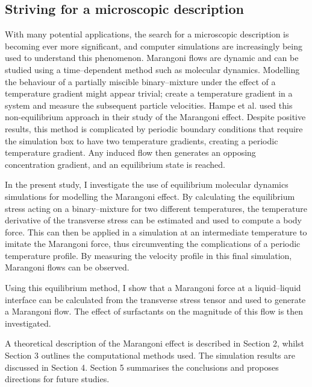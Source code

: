 \subsection{Striving for a microscopic description}
With many potential applications, the search for a microscopic description is becoming ever more significant, and computer simulations are increasingly being used to understand this phenomenon.
Marangoni flows are dynamic and can be studied using a time--dependent method such as molecular dynamics.
Modelling the behaviour of a partially miscible binary--mixture under the effect of a temperature gradient might appear trivial; create a temperature gradient in a system and measure the subsequent particle velocities.
Hampe et al. used this non-equilibrium approach in their study of the Marangoni effect.\cite{HolgerBoppHampe}
Despite positive results, this method is complicated by periodic boundary conditions that require the simulation box to have two temperature gradients, creating a periodic temperature gradient.
Any induced flow then generates an opposing concentration gradient, and an equilibrium state is reached.

In the present study, I investigate the use of equilibrium molecular dynamics simulations for modelling the Marangoni effect.
By calculating the equilibrium stress acting on a binary--mixture for two different temperatures, the temperature derivative of the transverse stress can be estimated and used to compute a body force.
This can then be applied in a simulation at an intermediate temperature to imitate the Marangoni force, thus circumventing the complications of a periodic temperature profile.
By measuring the velocity profile in this final simulation, Marangoni flows can be observed.

Using this equilibrium method, I show that a Marangoni force at a liquid--liquid interface can be calculated from the transverse stress tensor and used to generate a Marangoni flow.
The effect of surfactants on the magnitude of this flow is then investigated.

A theoretical description of the Marangoni effect is described in Section 2, whilst Section 3 outlines the computational methods used.
The simulation results are discussed in Section 4.
Section 5 summarises the conclusions and proposes directions for future studies.
